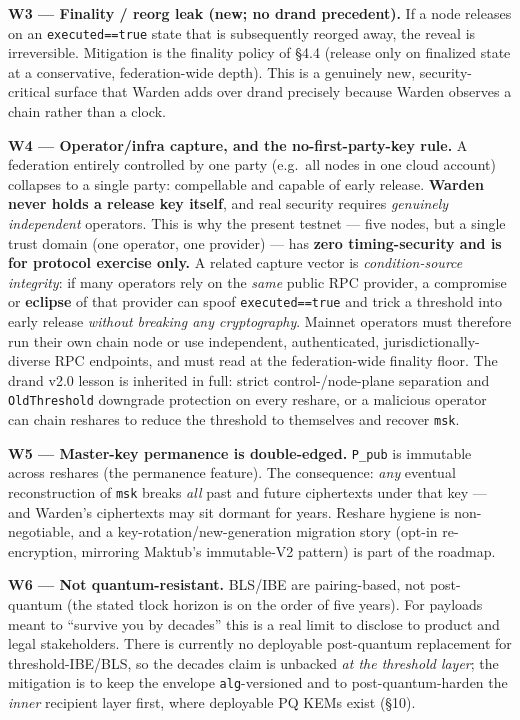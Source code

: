 \documentclass[
  11pt,
]{article}
\begin{document}
\textbf{W3 --- Finality / reorg leak (new; no drand precedent).} If a
node releases on an \texttt{executed==true} state that is subsequently
reorged away, the reveal is irreversible. Mitigation is the finality
policy of §4.4 (release only on finalized state at a conservative,
federation-wide depth). This is a genuinely new, security-critical
surface that Warden adds over drand precisely because Warden observes a
chain rather than a clock.

\textbf{W4 --- Operator/infra capture, and the no-first-party-key rule.}
A federation entirely controlled by one party (e.g.~all nodes in one
cloud account) collapses to a single party: compellable and capable of
early release. \textbf{Warden never holds a release key itself}, and
real security requires \emph{genuinely independent} operators. This is
why the present testnet --- five nodes, but a single trust domain (one
operator, one provider) --- has \textbf{zero timing-security and is for
protocol exercise only.} A related capture vector is
\emph{condition-source integrity}: if many operators rely on the
\emph{same} public RPC provider, a compromise or \textbf{eclipse} of
that provider can spoof \texttt{executed==true} and trick a threshold
into early release \emph{without breaking any cryptography}. Mainnet
operators must therefore run their own chain node or use independent,
authenticated, jurisdictionally-diverse RPC endpoints, and must read at
the federation-wide finality floor. The drand v2.0 lesson is inherited
in full: strict control-/node-plane separation and \texttt{OldThreshold}
downgrade protection on every reshare, or a malicious operator can chain
reshares to reduce the threshold to themselves and recover \texttt{msk}.

\textbf{W5 --- Master-key permanence is double-edged.} \texttt{P\_pub}
is immutable across reshares (the permanence feature). The consequence:
\emph{any} eventual reconstruction of \texttt{msk} breaks \emph{all}
past and future ciphertexts under that key --- and Warden's ciphertexts
may sit dormant for years. Reshare hygiene is non-negotiable, and a
key-rotation/new-generation migration story (opt-in re-encryption,
mirroring Maktub's immutable-V2 pattern) is part of the roadmap.

\textbf{W6 --- Not quantum-resistant.} BLS/IBE are pairing-based, not
post-quantum (the stated tlock horizon is on the order of five years).
For payloads meant to ``survive you by decades'' this is a real limit to
disclose to product and legal stakeholders. There is currently no
deployable post-quantum replacement for threshold-IBE/BLS, so the
decades claim is unbacked \emph{at the threshold layer}; the mitigation
is to keep the envelope \texttt{alg}-versioned and to
post-quantum-harden the \emph{inner} recipient layer first, where
deployable PQ KEMs exist (§10).
\end{document}
